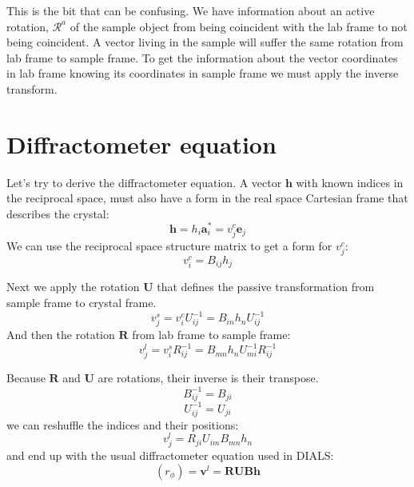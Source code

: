 \documentclass{article}
\begin{document}
This is the bit that can be confusing. We have information about an active rotation, $\mathcal{R}^a$ of the sample object from being coincident with the lab frame to not being coincident. A vector living in the sample will suffer the same rotation from lab frame to sample frame. To get the information about the vector coordinates in lab frame knowing its coordinates in sample frame we must apply the inverse transform.






\section{Diffractometer equation}

Let's try to derive the diffractometer equation. A vector $\mathbf{h}$ with known indices in the reciprocal space, must also have a form in the real space Cartesian frame that describes the crystal:
\begin{equation*}
    \mathbf{h} = h_i \mathbf{a}^{*}_i = v^c_j \mathbf{e}_j
\end{equation*}
We can use the reciprocal space structure matrix to get a form for $v^c_j$:
\begin{equation}
    v^c_i = B_{ij}h_j
\end{equation}

Next we apply the rotation $\mathbf{U}$ that defines the passive transformation from sample frame to crystal frame. 
\begin{equation}
    v^s_j = v^c_i U_{ij}^{-1} = B_{in}h_n U_{ij}^{-1}
\end{equation}
And then the rotation $\mathbf{R}$ from lab frame to sample frame:
\begin{equation}
    v^l_j = v^s_i R_{ij}^{-1} = B_{mn}h_n U_{mi}^{-1} R_{ij}^{-1}
\end{equation}

Because $\mathbf{R}$ and $\mathbf{U}$ are rotations, their inverse is their transpose.
\begin{equation*}
    B^{-1}_{ij} = B_{ji} 
\end{equation*}
\begin{equation*}
    U^{-1}_{ij} = U_{ji} 
\end{equation*}
we can reshuffle the indices and their positions:
\begin{equation*}
    v^l_j = R_{ji} U_{im}  B_{mn}   h_n
\end{equation*}
and end up with the usual diffractometer equation used in DIALS:
\begin{equation}
    (r_{\phi})= \mathbf{v}^l = \mathbf{R} \mathbf{U} \mathbf{B} \mathbf{h}
\end{equation}
\end{document}
